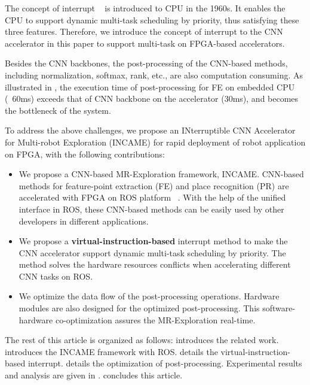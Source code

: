 The concept of interrupt  ~\cite{jen1974processor} is introduced to CPU in the 1960s. It enables the CPU to support dynamic multi-task scheduling by priority, thus satisfying these three features. Therefore, we introduce the concept of interrupt to the CNN accelerator in this paper to support multi-task on FPGA-based accelerators.

Besides the CNN backbones, the post-processing of the CNN-based methods, including normalization, softmax, rank, etc., are also computation consuming. As illustrated in , the execution time of post-processing for FE on embedded CPU (~60ms) exceeds that of CNN backbone on the accelerator (30ms), and becomes the bottleneck of the system.

To address the above challenges, we propose an INterruptible CNN Accelerator for Multi-robot Exploration (INCAME) for rapid deployment of robot application on FPGA, with the following contributions:

\begin{itemize}
\item We propose a CNN-based MR-Exploration framework, INCAME. CNN-based methods for feature-point extraction (FE) and place recognition (PR) are accelerated with FPGA on ROS platform ~\cite{quigley2009ros}. With the help of the unified interface in ROS, these CNN-based methods can be easily used by other developers in different applications.
\item We propose a \textbf{virtual-instruction-based} interrupt method to make the CNN accelerator support dynamic multi-task scheduling by priority. The method solves the hardware resources conflicts when accelerating different CNN tasks on ROS.
\item We optimize the data flow of the post-processing operations. Hardware modules are also designed for the optimized post-processing. This software-hardware co-optimization assures the MR-Exploration real-time.
\end{itemize}

The rest of this article is organized as follows:  introduces the related work.  introduces the INCAME framework with ROS.  details the {virtual-instruction-based} interrupt.  details the optimization of post-processing.  Experimental results and analysis are given in .  concludes this article.